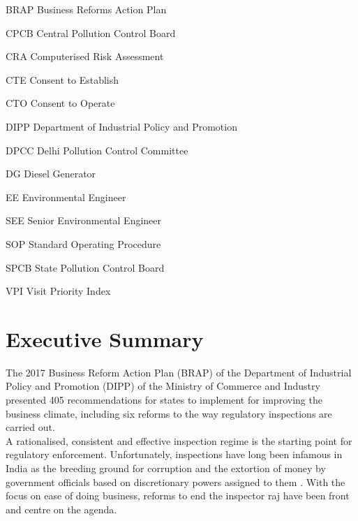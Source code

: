 \documentclass[a4paper, 12pt, twoside]{article}
\begin{document}
        
        \begin{abbrv}
        \item[BRAP]			Business Reforms Action Plan
        \item[CPCB]			Central Pollution Control Board
        \item[CRA]			Computerised Risk Assessment
        \item[CTE]				Consent to Establish
        \item[CTO]			Consent to Operate
        \item[DIPP]			Department of Industrial Policy and Promotion
        \item[DPCC]			Delhi Pollution Control Committee
        \item[DG]				Diesel Generator
        \item[EE]				Environmental Engineer
        \item[SEE]		                 Senior Environmental Engineer
        \item[SOP]			Standard Operating Procedure
        \item[SPCB]			State Pollution Control Board
        \item[VPI]				Visit Priority Index 
          
        
         
        \end{abbrv}
        
                    
                    \newpage
                    \section*{Executive Summary}
                    The 2017 Business Reform Action Plan (BRAP) of the Department of Industrial Policy and Promotion (DIPP) of the Ministry of Commerce and Industry presented 405 recommendations for states to implement for improving the business climate, including six reforms to the way regulatory inspections are carried out. \\
                  
                  A rationalised, consistent and effective inspection regime is the starting point for regulatory enforcement. Unfortunately, inspections have long been infamous in India as the breeding ground for corruption and the extortion of money by government officials based on discretionary powers assigned to them \parencite{PHD}. With the focus on ease of doing business, reforms to end the inspector raj \parencite{livemintnews} have been front and centre on the agenda. \\
                  
\end{document}
